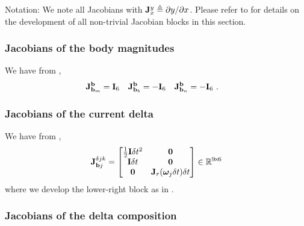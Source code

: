 \newcommand{\jac}[2]{{\bfJ^{#1}_{#2}}}

Notation: 
We note all Jacobians with $\jac{y}{x}\te\dparil{y}{x}$. 
Please refer to  for details on the development of all non-trivial Jacobian blocks in this section.



\subsubsection{Jacobians of the body magnitudes}

We have from ,
%
\begin{align}\label{equ:jac_body}
\jac{\bfb}{\bfb_m}&=\bfI_6 & \jac{\bfb}{\bfb_b}&=-\bfI_6 & \jac{\bfb}{\bfb_n}&=-\bfI_6
~.
\end{align}

\subsubsection{Jacobians of the current delta}
\label{sec:jac_data}

We have from ,
%
\begin{align}\label{equ:jac_current_delta}
\jac{\delta jk}{\bfb j} =
\begin{bmatrix}
\frac12\bfI\dt^2 	& \bf0 \\
\bfI\dt 			& \bf0 \\
\bf0 	          & \bfJ_r(\bw_j\dt)\dt
\end{bmatrix} 
\in \bbR^{9\tcross6}
\end{align}
%
where we develop the lower-right block as in .





\subsubsection{Jacobians of the delta composition}

